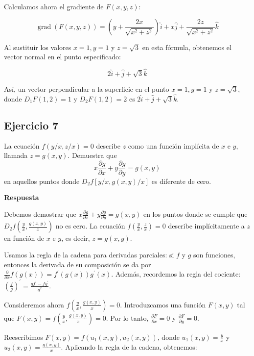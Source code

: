 \documentclass{report}
\begin{document}
Calculamos ahora el gradiente de $F(x, y, z)$:

\begin{equation*}
\operatorname{grad}(F(x, y, z)) = \left(y+\frac{2x}{\sqrt{x^2+z^2}}\right)\hat{i} + x\hat{j} + \frac{2z}{\sqrt{x^2+z^2}}\hat{k}
\end{equation*}

Al sustituir los valores $x=1, y=1$ y $z=\sqrt{3}$ en esta fórmula, obtenemos el vector normal en el punto especificado:

\begin{equation*}
2\hat{i} + \hat{j} + \sqrt{3}\hat{k}
\end{equation*}

Así, un vector perpendicular a la superficie en el punto $x=1, y=1$ y $z=\sqrt{3}$, donde $D_1 F(1,2)=1$ y $D_2 F(1,2)=2$ es $2\hat{i} + \hat{j} + \sqrt{3}\hat{k}$.\subsection{Ejercicio 7}
La ecuación $f(y / x, z / x)=0$ describe $z$ como una función implícita de $x$ e $y$, llamada $z=g(x, y)$. Demuestra que
$$
x \frac{\partial g}{\partial x}+y \frac{\partial g}{\partial y}=g(x, y)
$$
en aquellos puntos donde $D_{2} f[y / x, g(x, y) / x]$ es diferente de cero.

\textbf{Respuesta}

Debemos demostrar que $x \frac{\partial g}{\partial x}+y \frac{\partial g}{\partial y}=g(x, y)$ en los puntos donde se cumple que $D_2 f\left(\frac{y}{x}, \frac{g(x, y)}{x}\right)$ no es cero. La ecuación $f\left(\frac{y}{x}, \frac{z}{x}\right)=0$ describe implícitamente a $z$ en función de $x$ e $y$, es decir, $z=g(x, y)$.

Usamos la regla de la cadena para derivadas parciales: si $f$ y $g$ son funciones, entonces la derivada de su composición se da por $\frac{\partial}{\partial x} f(g(x))=f^{\prime}(g(x)) g^{\prime}(x)$. Además, recordemos la regla del cociente: $\left(\frac{f}{g}\right)^{\prime}=\frac{g f^{\prime}-f g^{\prime}}{g^2}$.

Consideremos ahora $f\left(\frac{y}{x}, \frac{g(x, y)}{x}\right)=0$. Introduzcamos una función $F(x, y)$ tal que $F(x, y)=f\left(\frac{y}{x}, \frac{g(x, y)}{x}\right)=0$. Por lo tanto, $\frac{\partial F}{\partial x}=0$ y $\frac{\partial F}{\partial y}=0$.

Reescribimos $F(x, y)=f\left(u_1(x, y), u_2(x, y)\right)$, donde $u_1(x, y)=\frac{y}{x}$ y $u_2(x, y)=\frac{g(x, y)}{x}$. Aplicando la regla de la cadena, obtenemos:
\end{document}
